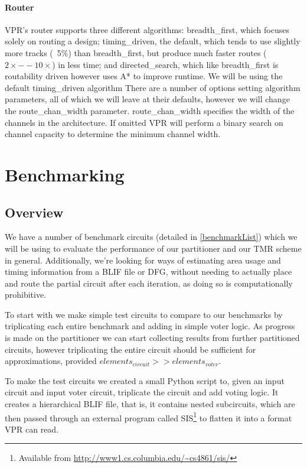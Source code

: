 \documentclass[12pt,drafta4paper,oneside]{memoir} %
\begin{document}
\subsubsection{Router}
\ac{VPR}'s router supports three different algorithms: breadth\_first, which focuses solely on routing a design; timing\_driven, the default, which tends to use slightly more tracks (~5\%) than breadth\_first, but produce much faster routes ($2\times--10\times$) in less time; and directed\_search, which like breadth\_first is routability driven however uses A* to improve runtime. We will be using the default timing\_driven algorithm 
There are a number of options setting algorithm parameters, all of which we will leave at their defaults, however we will change the route\_chan\_width parameter. route\_chan\_width specifies the width of the channels in the architecture. If omitted \ac{VPR} will perform a binary search on channel capacity to determine the minimum channel width.

\chapter{Benchmarking}
\section{Overview}
We have a number of benchmark circuits (detailed in \ref{benchmarkList}) which we will be using to evaluate the performance of our partitioner and our \ac{TMR} scheme in general.
Additionally, we're looking for ways of estimating area usage and timing information from a \ac{BLIF} file or \ac{DFG}, without needing to actually place and route the partial circuit after each iteration, as doing so is computationally prohibitive.

To start with we make simple test circuits to compare to our benchmarks by triplicating each entire benchmark and adding in simple voter logic. As progress is made on the partitioner we can start collecting results from further partitioned circuits, however triplicating the entire circuit should be sufficient for approximations, provided $elements_{circuit} >> elements_{voter}$.

To make the test circuits we created a small Python script to, given an input circuit and input voter circuit, triplicate the circuit and add voting logic. It creates a hierarchical \ac{BLIF} file, that is, it contains nested subcircuits, which are then passed through an external program called \ac{SIS}\footnote{Available from \url{http://www1.cs.columbia.edu/~cs4861/sis/}} to flatten it into a format \ac{VPR} can read.
\end{document}
